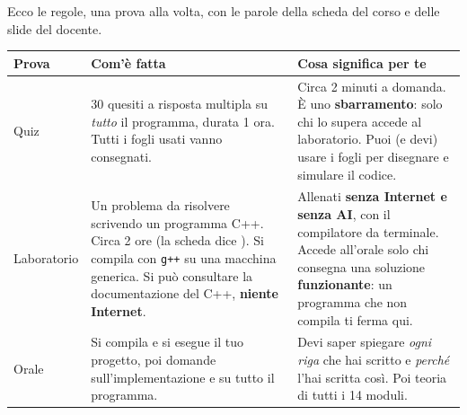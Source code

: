 \begin{center}
\end{center}

Ecco le regole, una prova alla volta, con le parole della scheda del corso e delle slide
del docente.

\begin{center}\small
\begin{tabular}{lp{5.2cm}p{6.2cm}}
\toprule
\textbf{Prova} & \textbf{Com'è fatta} & \textbf{Cosa significa per te} \\
\midrule
Quiz & 30 quesiti a risposta multipla su \emph{tutto} il programma, durata 1 ora. Tutti i
fogli usati vanno consegnati. &
Circa 2 minuti a domanda. È uno \textbf{sbarramento}: solo chi lo supera accede al
laboratorio. Puoi (e devi) usare i fogli per disegnare e simulare il codice. \\
\addlinespace
Laboratorio & Un problema da risolvere scrivendo un programma C++. Circa 2 ore (la scheda
dice \q{tipicamente 2/3 ore}). Si compila con \texttt{g++} su una macchina generica. Si può
consultare la documentazione del C++, \textbf{niente Internet}. &
Allenati \textbf{senza Internet e senza AI}, con il compilatore da terminale. Accede
all'orale solo chi consegna una soluzione \textbf{funzionante}: un programma che non
compila ti ferma qui. \\
\addlinespace
Orale & Si compila e si esegue il tuo progetto, poi domande sull'implementazione e su
tutto il programma. &
Devi saper spiegare \emph{ogni riga} che hai scritto e \emph{perché} l'hai scritta così.
Poi teoria di tutti i 14 moduli. \\
\bottomrule
\end{tabular}
\end{center}

